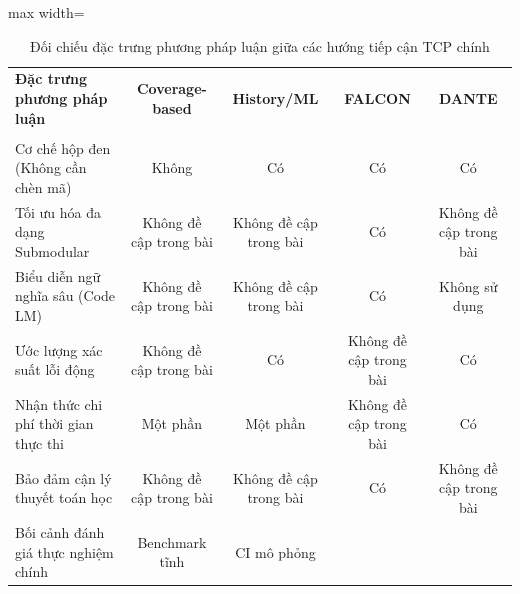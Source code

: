 \begin{table}[H]
\centering
\caption{Đối chiếu đặc trưng phương pháp luận giữa các hướng tiếp cận TCP chính}
\label{tab:tcp_paradigm_comparison}
\begin{adjustbox}{max width=\textwidth}
\footnotesize
\begin{tabular}{lcccc}
\toprule
\textbf{Đặc trưng phương pháp luận} & \textbf{Coverage-based} & \textbf{History/ML} & \textbf{FALCON} & \textbf{DANTE} \\
& \cite{rothermel1999tcp, elbaum2002tcp} & \cite{kim2002history, spieker2017reinforcement} & \cite{falcon2026} & \cite{dante2026} \\
\midrule
Cơ chế hộp đen (Không cần chèn mã)      
& Không %
& Có %
& Có %
& Có %
\\
Tối ưu hóa đa dạng Submodular          
& Không đề cập trong bài %
& Không đề cập trong bài %
& Có %
& Không đề cập trong bài %
\\
Biểu diễn ngữ nghĩa sâu (Code LM)      
& Không đề cập trong bài %
& Không đề cập trong bài %
& Có %
& Không sử dụng %
\\
Ước lượng xác suất lỗi động            
& Không đề cập trong bài %
& Có %
& Không đề cập trong bài %
& Có %
\\
Nhận thức chi phí thời gian thực thi   
& Một phần %
& Một phần %
& Không đề cập trong bài %
& Có %
\\
Bảo đảm cận lý thuyết toán học         
& Không đề cập trong bài %
& Không đề cập trong bài %
& Có %
& Không đề cập trong bài %
\\
Bối cảnh đánh giá thực nghiệm chính    
& Benchmark tĩnh %
& CI mô phỏng %

\end{tabular}
\end{adjustbox}
\end{table}
